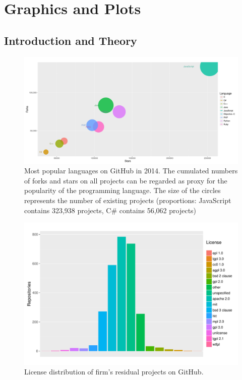 \section{Graphics and Plots}

\subsection{Introduction and Theory}

\begin{figure}[h]
	\centering
	\includegraphics[page=1,scale=0.35]{../graphics/intro/popular_programming_languages.pdf}
	\caption[]{ Most popular languages on GitHub in 2014. The cumulated numbers of forks and stars on all projects can be regarded as proxy for the popularity of the programming language. The size of the circles represents the number of existing projects (proportions: JavaScript contains 323,938 projects, C\# contains 56,062 projects) \footnotemark}
	\label{fig:github_popular_programming_languages}
\end{figure}


\begin{figure}[h]
	\centering
	\includegraphics[page=1,scale=0.35]{../graphics/intro/licenses/popular_licenses_residual.pdf}
	\caption{License distribution of firm's residual projects on GitHub.}
	\label{fig:licenses_in_residual_projects}
\end{figure}

